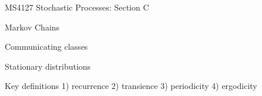 MS4127 Stochastic Processes: Section C
 
Markov Chains
 
Communicating classes
 
Stationary distributions
 
Key definitions
1) recurrence
2) transience
3) periodicity
4) ergodicity
